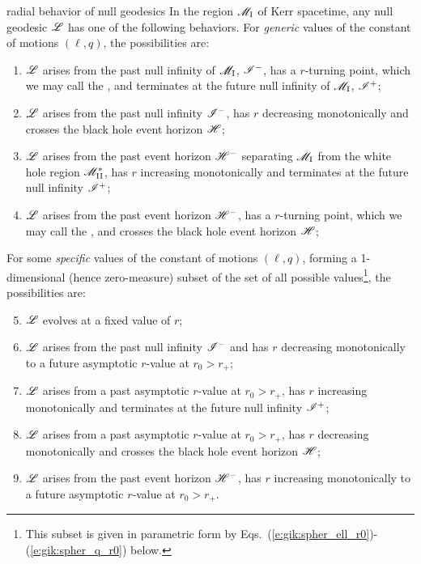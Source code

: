 \begin{tprop}{radial behavior of null geodesics}{}
In the region $\mathscr{M}_{\rm I}$ of Kerr spacetime,
any null geodesic $\mathscr{L}$ has one of the following behaviors.
For \emph{generic} values of the constant of motions $(\ell, q)$, the possibilities are:
\begin{enumerate}
\item $\mathscr{L}$ arises from the past null infinity of $\mathscr{M}_{\rm I}$, $\mathscr{I}^-$, has a $r$-turning point,
which we may call the , and terminates at the future null infinity
of $\mathscr{M}_{\rm I}$, $\mathscr{I}^+$;
\item $\mathscr{L}$ arises from the past null infinity $\mathscr{I}^-$, has $r$ decreasing
monotonically and crosses the black hole event horizon $\mathscr{H}$;
\item $\mathscr{L}$ arises from the past event horizon $\mathscr{H}^-$ separating $\mathscr{M}_{\rm I}$
from the white hole region $\mathscr{M}_{\rm II}^*$, has $r$ increasing monotonically and
terminates at the future null infinity $\mathscr{I}^+$;
\item $\mathscr{L}$ arises from the past event horizon $\mathscr{H}^-$, has a $r$-turning point,
which we may call the , and crosses the black hole event horizon $\mathscr{H}$;
\end{enumerate}
For some \emph{specific} values of the constant of motions $(\ell, q)$,
forming a 1-dimensional (hence zero-measure) subset of the set of all possible values\footnote{This
subset is given in parametric form by Eqs.~(\ref{e:gik:spher_ell_r0})-(\ref{e:gik:spher_q_r0}) below.},
the possibilities are:
\begin{enumerate}
\setcounter{enumi}{4}
\item $\mathscr{L}$ evolves at a fixed value of $r$;
\item $\mathscr{L}$ arises from the past null infinity $\mathscr{I}^-$
and has $r$ decreasing monotonically to
a future asymptotic $r$-value at $r_0 > r_+$;
\item $\mathscr{L}$ arises from a past asymptotic $r$-value at $r_0 > r_+$, has
$r$ increasing monotonically and terminates at the future null infinity
$\mathscr{I}^+$;
\item $\mathscr{L}$ arises from a past asymptotic $r$-value at $r_0 > r_+$, has
$r$ decreasing monotonically and crosses the black hole event horizon $\mathscr{H}$;
\item $\mathscr{L}$ arises from the past event horizon $\mathscr{H}^-$, has
$r$ increasing monotonically to
a future asymptotic $r$-value at $r_0 > r_+$.
\end{enumerate}
\end{tprop}



